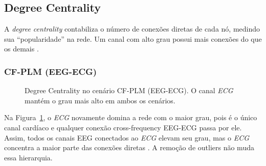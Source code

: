 \subsection{Degree Centrality}
A \emph{degree centrality} contabiliza o número de conexões diretas de cada nó, medindo sua “popularidade” na rede. Um canal com alto grau possui mais conexões do que os demais \cite{newman2010networks}.

\subsubsection{CF-PLM (EEG-ECG)}
\begin{figure}[htb]
    \centering
    \quad
    \caption{Degree Centrality no cenário CF-PLM (EEG-ECG). O canal \emph{ECG} mantém o grau mais alto em ambos os cenários.}
    \label{fig:dc_cfplm_eegecg}
\end{figure}

Na Figura~\ref{fig:dc_cfplm_eegecg}, o \emph{ECG} novamente domina a rede com o maior grau, pois é o único canal cardíaco e qualquer conexão cross-frequency EEG-ECG passa por ele. Assim, todos os canais EEG conectados ao \emph{ECG} elevam seu grau, mas o \emph{ECG} concentra a maior parte das conexões diretas \cite{rubinov2010complex}. A remoção de outliers não muda essa hierarquia.

